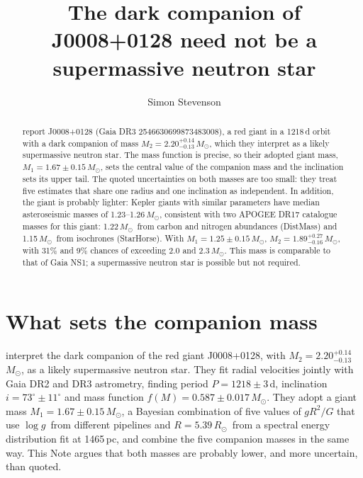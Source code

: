\documentclass{aastex701}
\newcommand{\msun}{\ensuremath{M_\odot}}
\newcommand{\rsun}{\ensuremath{R_\odot}}
\newcommand{\logg}{\ensuremath{\log g}}
\begin{document}
\title{The dark companion of J0008+0128 need not be a supermassive neutron star}

\author[orcid=0000-0002-6100-537X]{Simon Stevenson}

\begin{abstract}
\citet{Zhao2026} report J0008+0128 (Gaia DR3 2546630699873483008), a red giant in a 1218\,d orbit with a dark companion of mass $M_2=2.20^{+0.14}_{-0.13}$\,\msun, which they interpret as a likely supermassive neutron star. The mass function is precise, so their adopted giant mass, $M_1=1.67\pm0.15$\,\msun, sets the central value of the companion mass and the inclination sets its upper tail. The quoted uncertainties on both masses are too small: they treat five estimates that share one radius and one inclination as independent. In addition, the giant is probably lighter: Kepler giants with similar parameters have median asteroseismic masses of 1.23--1.26\,\msun, consistent with two APOGEE DR17 catalogue masses for this giant: 1.22\,\msun\ from carbon and nitrogen abundances (DistMass) and 1.15\,\msun\ from isochrones (StarHorse). With $M_1=1.25\pm0.15$\,\msun, $M_2=1.89^{+0.27}_{-0.16}$\,\msun, with 31\% and 9\% chances of exceeding 2.0 and 2.3\,\msun. This mass is comparable to that of Gaia NS1; a supermassive neutron star is possible but not required.
\end{abstract}


\section{What sets the companion mass}

\citet{Zhao2026} interpret the dark companion of the red giant J0008+0128, with $M_2=2.20^{+0.14}_{-0.13}$\,\msun, as a likely supermassive neutron star. They fit radial velocities jointly with Gaia DR2 and DR3 astrometry, finding period $P=1218\pm3$\,d, inclination $i=73^\circ\pm11^\circ$ and mass function $f(M)=0.587\pm0.017$\,\msun. They adopt a giant mass $M_1=1.67\pm0.15$\,\msun, a Bayesian combination of five values of $gR^2/G$ that use \logg\ from different pipelines and $R=5.39$\,\rsun\ from a spectral energy distribution fit at 1465\,pc, and combine the five companion masses in the same way. This Note argues that both masses are probably lower, and more uncertain, than quoted.
\end{document}
